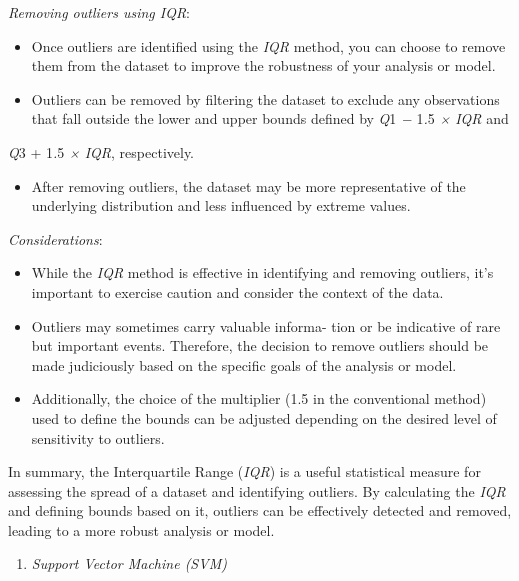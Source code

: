 \emph{Removing outliers using IQR}:

\begin{itemize}
\item
  Once outliers are identified using the \emph{IQR} method, you can
  choose to remove them from the dataset to improve the robustness of
  your analysis or model.
\item
  Outliers can be removed by filtering the dataset to exclude any
  observations that fall outside the lower and upper bounds defined by
  \emph{Q}1 \emph{−} 1\emph{.}5 \emph{× IQR} and
\end{itemize}

\emph{Q}3 + 1\emph{.}5 \emph{× IQR}, respectively.

\begin{itemize}
\item
  After removing outliers, the dataset may be more representative of the
  underlying distribution and less influenced by extreme values.
\end{itemize}

\emph{Considerations}:

\begin{itemize}
\item
  While the \emph{IQR} method is effective in identifying and removing
  outliers, it's important to exercise caution and consider the context
  of the data.
\item
  Outliers may sometimes carry valuable informa- tion or be indicative
  of rare but important events. Therefore, the decision to remove
  outliers should be made judiciously based on the specific goals of the
  analysis or model.
\item
  Additionally, the choice of the multiplier (1.5 in the conventional
  method) used to define the bounds can be adjusted depending on the
  desired level of sensitivity to outliers.
\end{itemize}

In summary, the Interquartile Range (\emph{IQR}) is a useful statistical
measure for assessing the spread of a dataset and identifying outliers.
By calculating the \emph{IQR} and defining bounds based on it, outliers
can be effectively detected and removed, leading to a more robust
analysis or model.

\begin{enumerate}
\def\labelenumi{\Alph{enumi}.}
\setcounter{enumi}{5}
\item
  \emph{Support Vector Machine (SVM)}
\end{enumerate}

